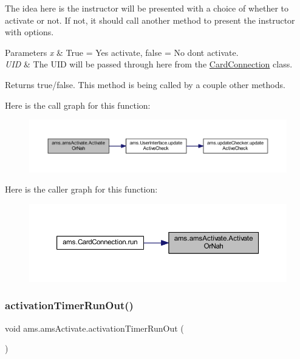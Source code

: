 The idea here is the instructor will be presented with a choice of whether to activate or not. If not, it should call another method to present the instructor with options. 
\begin{DoxyParams}{Parameters}
{\em x} & True = Yes activate, false = No don\textquotesingle{}t activate. \\
\hline
{\em U\+ID} & The U\+ID will be passed through here from the \mbox{\hyperlink{classams_1_1_card_connection}{Card\+Connection}} class. \\
\hline
\end{DoxyParams}
\begin{DoxyReturn}{Returns}
true/false. This method is being called by a couple other methods. 
\end{DoxyReturn}
Here is the call graph for this function\+:\nopagebreak
\begin{figure}[H]
\begin{center}
\leavevmode
\includegraphics[width=350pt]{classams_1_1ams_activate_a01ac1b9a3cd5d20b61b46496a7ff3a95_cgraph}
\end{center}
\end{figure}
Here is the caller graph for this function\+:\nopagebreak
\begin{figure}[H]
\begin{center}
\leavevmode
\includegraphics[width=350pt]{classams_1_1ams_activate_a01ac1b9a3cd5d20b61b46496a7ff3a95_icgraph}
\end{center}
\end{figure}
\mbox{\label{classams_1_1ams_activate_a5ed697f974ce79263f7974f29a11312b}} 
\subsubsection{\texorpdfstring{activationTimerRunOut()}{activationTimerRunOut()}}
{\footnotesize\ttfamily void ams.\+ams\+Activate.\+activation\+Timer\+Run\+Out (\begin{DoxyParamCaption}{ }\end{DoxyParamCaption})}

